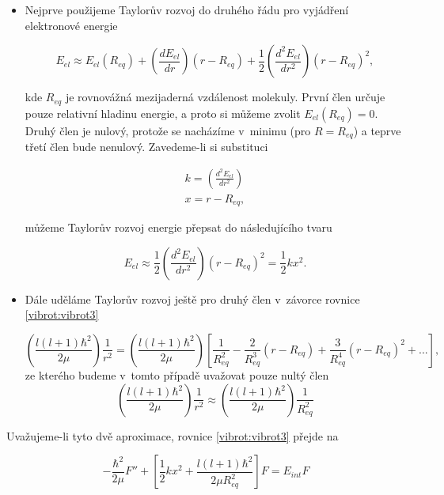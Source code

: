 \begin{itemize}

\item Nejprve použijeme Taylorův rozvoj do druhého řádu pro vyjádření elektronové energie

\begin{equation}
E_{el}\approx E_{el}(R_{eq})+\left(\frac{dE_{el}}{dr}\right)(r-R_{eq})+\frac{1}{2}\left(\frac{d^2E_{el}}{dr^2}\right)(r-R_{eq})^2, 
\end{equation}

\noindent kde $R_{eq}$ je rovnovážná mezijaderná vzdálenost molekuly. První člen určuje pouze relativní hladinu energie, a proto si můžeme zvolit $E_{el}(R_{eq})=0$. Druhý člen je nulový, protože se nacházíme v~minimu (pro $R = R_{eq}$) a teprve třetí člen bude nenulový. Zavedeme-li si substituci

\begin{eqnarray}
k=\left(\frac{d^2E_{el}}{dr^2}\right)\nonumber \\
x=r-R_{eq}\nonumber,
\end{eqnarray}

\noindent můžeme Taylorův rozvoj energie přepsat do následujícího tvaru

\begin{equation}
E_{el}\approx\frac{1}{2}\left(\frac{d^2E_{el}}{dr^2}\right)(r-R_{eq})^2=\frac{1}{2}kx^2.
\end{equation}

\item Dále uděláme Taylorův rozvoj ještě pro druhý člen v~závorce rovnice \ref{vibrot:vibrot3}

\begin{equation}
\left(\frac{l\left(l+1\right)\hbar^2}{2\mu}\right)\frac{1}{r^2} =
\left(\frac{l\left(l+1\right)\hbar^2}{2\mu}\right)
\left[\frac{1}{R_{eq}^2}
-\frac{2}{R_{eq}^3}(r-R_{eq})
+\frac{3}{R_{eq}^4}(r-R_{eq})^2+...
\right],
\end{equation}
ze kterého budeme v~tomto případě uvažovat pouze nultý člen
\begin{equation}
\left(\frac{l\left(l+1\right)\hbar^2}{2\mu}\right)\frac{1}{r^2} \approx \left(\frac{l\left(l+1\right)\hbar^2}{2\mu}\right)\frac{1}{R_{eq}^2}
\end{equation}
\end{itemize}

Uvažujeme-li tyto dvě aproximace, rovnice \ref{vibrot:vibrot3} přejde na 

\begin{equation}
-\frac{\hbar^2}{2\mu}F''+\left[\frac{1}{2}kx^2+\frac{l\left(l+1\right)\hbar^2}{2\mu R_{eq}^2}\right]F=E_{int}F 
\label{vibrot:vibrot4}
\end{equation}

